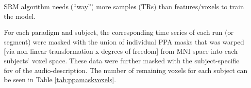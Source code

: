







SRM algorithm needs (``way'') more samples (TRs) than features/voxels to train
the model.

For each paradigm and subject, the corresponding time series of each run (or
segment) were masked with the union of individual PPA masks
\citep[s.][]{haeusler2022processing} that was warped [via non-linear
transformation x degrees of freedom] from MNI space into each subjects' voxel
space.
These data were further masked with the subject-specific \ac{fov} of the
audio-description.
%
The number of remaining voxels for each subject can be seen in Table
\ref{tab:ppamaskvoxels}.


